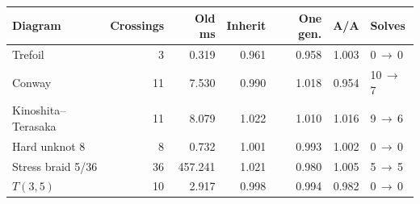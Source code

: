 \begin{center}
\small
\begin{tabular}{lrrrrrl}
\toprule
Diagram & Crossings & Old ms & Inherit & One gen. & A/A & Solves\\
\midrule
Trefoil & 3 & 0.319 & 0.961 & 0.958 & 1.003 & 0\,$\to$\,0\\
Conway & 11 & 7.530 & 0.990 & 1.018 & 0.954 & 10\,$\to$\,7\\
Kinoshita--Terasaka & 11 & 8.079 & 1.022 & 1.010 & 1.016 & 9\,$\to$\,6\\
Hard unknot 8 & 8 & 0.732 & 1.001 & 0.993 & 1.002 & 0\,$\to$\,0\\
Stress braid 5/36 & 36 & 457.241 & 1.021 & 0.980 & 1.005 & 5\,$\to$\,5\\
$T(3,5)$ & 10 & 2.917 & 0.998 & 0.994 & 0.982 & 0\,$\to$\,0\\
\bottomrule
\end{tabular}
\end{center}

